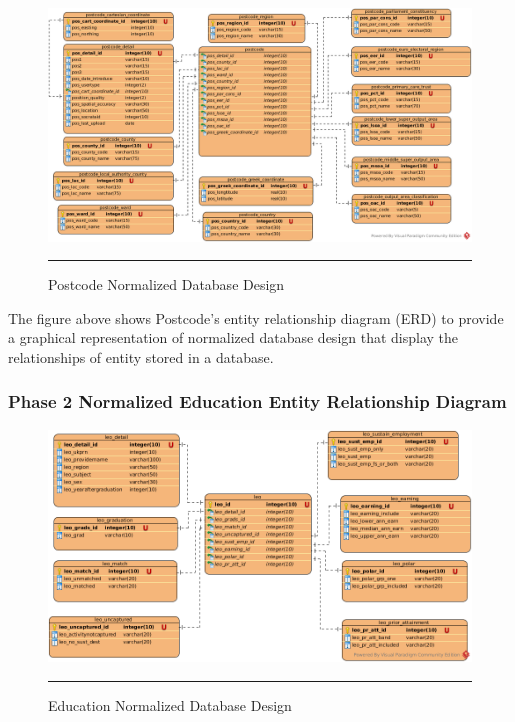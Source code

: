 \begin{figure}[H]
	\centering
	\includegraphics[width=1.1\textwidth]{FYP2/Chapter3/FYP2-Postcode-Normalized-ERD.png}
	\rule{35em}{0.5pt}
	\caption[Postcode Normalized Database Design]{Postcode Normalized Database Design}
\end{figure} 

The figure above shows Postcode's entity relationship diagram (ERD) to provide a graphical representation of normalized database design that display the relationships of entity stored in a database. 

\subsubsection{Phase 2 Normalized Education Entity Relationship Diagram} 

\begin{figure}[H]
	\centering
	\includegraphics[width=1.1\textwidth]{FYP2/Chapter3/FYP2-Education-Normalized-ERD.png}
	\rule{35em}{0.5pt}
	\caption[Education Normalized Database Design]{Education Normalized Database Design}
\end{figure} 

